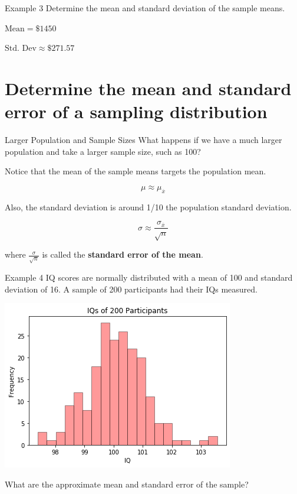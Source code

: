 \documentclass[t]{beamer}
\begin{document}
\begin{frame}{Example 3}
Determine the mean and standard deviation of the sample means.	\newline\\	\pause

$\text{Mean} = \$1450$ \newline\\	\pause

$\text{Std. Dev} \approx \$271.57$
\end{frame}

\section{Determine the mean and standard error of a sampling distribution}

\begin{frame}{Larger Population and Sample Sizes}
What happens if we have a much larger population and take a larger sample size, such as 100?	\newline\\	\pause

Notice that the mean of the sample means targets the population mean. 	\pause

\[\mu \approx \mu_{\overline{x}}\]		\pause

Also, the standard deviation is around 1/10 the population standard deviation. 	\pause

\[\sigma \approx \frac{\sigma_{\overline{x}}}{\sqrt{n}}\]

where $\frac{\sigma}{\sqrt{n}}$ is called the {\color{blue}\textbf{standard error of the mean}}.
\end{frame}

\begin{frame}{Example 4}
IQ scores are normally distributed with a mean of 100 and standard deviation of 16. A sample of 200 participants had their IQs measured.	\pause
\begin{center}
\includegraphics[scale=0.45]{../Images/sample_means_IQ.png}
\end{center}
\smallskip	\pause
What are the approximate mean and standard error of the sample?
\end{frame}
\end{document}
